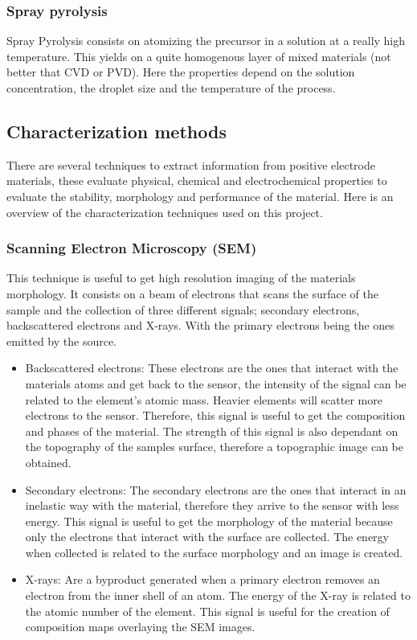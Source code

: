 \documentclass{article}
\begin{document}
{\subsubsection{Spray pyrolysis}
Spray Pyrolysis consists on atomizing the precursor in a solution at a really high temperature. This yields on a 
quite homogenous layer of mixed materials (not better that CVD or PVD). Here the properties depend on the solution concentration, the 
droplet size and the temperature of the process\cite{process}.

\subsection{Characterization methods}
There are several techniques to extract information from positive electrode materials,
these evaluate physical, chemical and electrochemical properties to evaluate the stability, morphology 
and performance of the material. Here is an overview of the characterization techniques used on this project.\\
\subsubsection{Scanning Electron Microscopy (SEM)}
This technique is useful to get high resolution imaging of the materials morphology.
It consists on a beam of electrons that scans the surface of the sample and the collection of three 
different signals; secondary electrons, backscattered electrons and X-rays. With the primary electrons 
being the ones emitted by the source.\\
\begin {itemize}
\item Backscattered electrons: These electrons are the ones that interact with the materials atoms and get back to
the sensor, the intensity of the signal can be related to the element's atomic mass. Heavier elements will scatter more electrons
to the sensor. Therefore, this signal is useful to get the composition and phases of the material.
The strength of this signal is also dependant on the topography of the samples surface, therefore a topographic image can be obtained.\\
\item Secondary electrons: The secondary electrons are the ones that interact in an inelastic way with the material, therefore they arrive to
the sensor with less energy. This signal is useful to get the morphology of the material because only the electrons that interact with the surface
are collected. The energy when collected is related to the surface morphology and an image is created.\\
\item X-rays: Are a byproduct generated when a primary electron removes an electron from the inner shell of an atom. The energy of the X-ray is related to the
atomic number of the element. This signal is useful for the creation of composition maps overlaying the 
SEM images.\\
\end{itemize}

}
\end{document}
